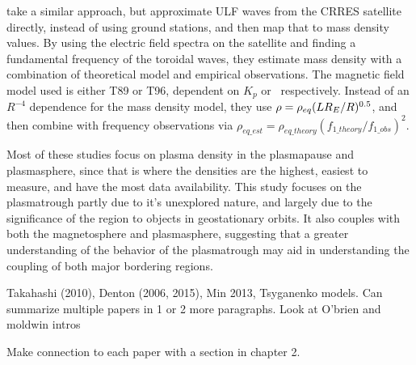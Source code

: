 \cite{Takahashi2006MassDensityInferred} take a similar approach, but approximate ULF waves from the CRRES satellite directly, instead of using ground stations, and then map that to mass density values. By using the electric field spectra on the satellite and finding a fundamental frequency of the toroidal waves, they estimate mass density with a combination of theoretical model and empirical observations. The magnetic field model used is either T89 or T96, dependent on $K_p$ or \dst\  respectively. Instead of an $R^{-4}$ dependence for the mass density model, they use $\rho=\rho_{eq}(LR_E/R)^{0.5}$, and then combine with frequency observations via $\rho_{eq\_est}=\rho_{eq\_theory}(f_{1\_theory}/f_{1\_obs})^2$.

Most of these studies focus on plasma density in the plasmapause and plasmasphere, since that is where the densities are the highest, easiest to measure, and have the most data availability. This study focuses on the plasmatrough partly due to it's unexplored nature, and largely due to the significance of the region to objects in geostationary orbits. It also couples with both the magnetosphere and plasmasphere, suggesting that a greater understanding of the behavior of the plasmatrough may aid in understanding the coupling of both major bordering regions.


\vnote Takahashi (2010), Denton (2006, 2015), Min 2013, Tsyganenko models. Can summarize multiple papers in 1 or 2 more paragraphs. Look at O'brien and moldwin intros

\note Make connection to each paper with a section in chapter 2.


